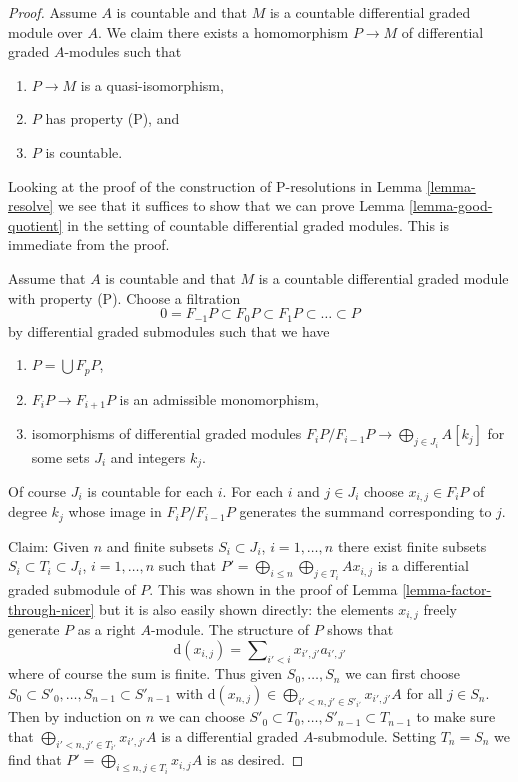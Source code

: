 \documentclass{stacks-project}
\theoremstyle{plain}
\theoremstyle{definition}
\theoremstyle{remark}
\numberwithin{equation}{subsection}
\begin{document}
\begin{proof}
\medskip\noindent
Assume $A$ is countable and that $M$ is a countable differential graded
module over $A$. We claim there exists a homomorphism
$P \to M$ of differential graded $A$-modules such that
\begin{enumerate}
\item $P \to M$ is a quasi-isomorphism,
\item $P$ has property (P), and
\item $P$ is countable.
\end{enumerate}
Looking at the proof of the construction of P-resolutions in
Lemma \ref{lemma-resolve} we see that it suffices to show that
we can prove Lemma \ref{lemma-good-quotient}
in the setting of countable differential graded modules.
This is immediate from the proof.

\medskip\noindent
Assume that $A$ is countable and that $M$ is a countable
differential graded module with property (P). Choose a filtration
$$
0 = F_{-1}P \subset F_0P \subset F_1P \subset \ldots \subset P
$$
by differential graded submodules such that we have
\begin{enumerate}
\item $P = \bigcup F_pP$,
\item $F_iP \to F_{i + 1}P$ is an admissible monomorphism,
\item isomorphisms of differential graded modules
$F_iP/F_{i - 1}P \to \bigoplus_{j \in J_i} A[k_j]$
for some sets $J_i$ and integers $k_j$.
\end{enumerate}
Of course $J_i$ is countable for each $i$. For each $i$ and
$j \in J_i$ choose $x_{i, j} \in F_iP$ of degree $k_j$ whose
image in $F_iP/F_{i - 1}P$ generates the summand corresponding
to $j$.

\medskip\noindent
Claim: Given $n$ and finite subsets $S_i \subset J_i$, $i = 1, \ldots, n$
there exist finite subsets $S_i \subset T_i \subset J_i$, $i = 1, \ldots, n$
such that $P' = \bigoplus_{i \leq n} \bigoplus_{j \in T_i} Ax_{i, j}$
is a differential graded submodule of $P$. This was shown in the
proof of Lemma \ref{lemma-factor-through-nicer} but it is also
easily shown directly: the elements $x_{i, j}$ freely generate
$P$ as a right $A$-module. The structure of $P$ shows that
$$
\text{d}(x_{i, j}) = \sum\nolimits_{i' < i} x_{i', j'}a_{i', j'}
$$
where of course the sum is finite.
Thus given $S_0, \ldots, S_n$ we can first choose
$S_0 \subset S'_0, \ldots, S_{n - 1} \subset S'_{n - 1}$ with
$\text{d}(x_{n, j}) \in \bigoplus_{i' < n, j' \in S'_{i'}} x_{i', j'}A$
for all $j \in S_n$. Then by induction on $n$ we can choose
$S'_0 \subset T_0, \ldots, S'_{n - 1} \subset T_{n - 1}$
to make sure that $\bigoplus_{i' < n, j' \in T_{i'}} x_{i', j'}A$
is a differential graded $A$-submodule. Setting $T_n = S_n$ we find that
$P' = \bigoplus_{i \leq n, j \in T_i} x_{i, j}A$ is as desired.


\end{proof}
\end{document}
